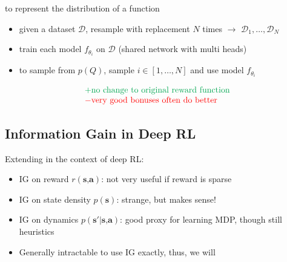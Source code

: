  to represent the distribution of a function \cite{osband2016deep}
\begin{itemize}
	\item given a dataset $\mathcal{D}$, resample with replacement $N$ times $\rightarrow$ $\mathcal{D}_1, \dots, \mathcal{D}_N$
	\item train each model $f_{\theta_i}$ on $\mathcal{D}$ (\note shared network with multi heads)
	\item to sample from $p(Q)$, sample $i \in [1, \dots, N]$ and use model $f_{\theta_i}$
\end{itemize}
\[\begin{matrix*}[l]
	\color{Green}+ \text{no change to original reward function}\\
	\color{red}- \text{very good bonuses often do better}
\end{matrix*}\]

\subsection{Information Gain in Deep RL}
Extending  in the context of deep \ac{RL}:
\begin{itemize}
	\item \ac{IG} on reward $r(\textbf{s,a})$: not very useful if reward is sparse
	\item \ac{IG} on state density $p(\textbf{s})$: strange, but makes sense!
	\item \ac{IG} on dynamics $p(\textbf{s}'|\textbf{s,a})$: good proxy for learning \ac{MDP}, though still heuristics
	\item Generally intractable to use \ac{IG} exactly, thus, we will 
\end{itemize}

